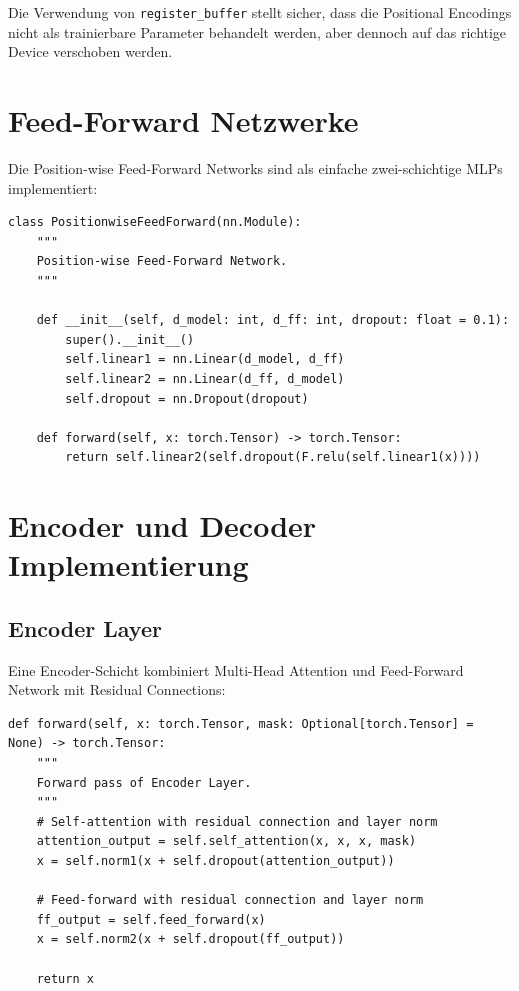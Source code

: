 Die Verwendung von \texttt{register\_buffer} stellt sicher, dass die Positional Encodings nicht als trainierbare Parameter behandelt werden, aber dennoch auf das richtige Device verschoben werden.

\section{Feed-Forward Netzwerke}

Die Position-wise Feed-Forward Networks sind als einfache zwei-schichtige MLPs implementiert:

\begin{lstlisting}[style=pythonstyle, caption=Feed-Forward Network Implementierung]
class PositionwiseFeedForward(nn.Module):
    """
    Position-wise Feed-Forward Network.
    """
    
    def __init__(self, d_model: int, d_ff: int, dropout: float = 0.1):
        super().__init__()
        self.linear1 = nn.Linear(d_model, d_ff)
        self.linear2 = nn.Linear(d_ff, d_model)
        self.dropout = nn.Dropout(dropout)
        
    def forward(self, x: torch.Tensor) -> torch.Tensor:
        return self.linear2(self.dropout(F.relu(self.linear1(x))))
\end{lstlisting}

\section{Encoder und Decoder Implementierung}

\subsection{Encoder Layer}

Eine Encoder-Schicht kombiniert Multi-Head Attention und Feed-Forward Network mit Residual Connections:

\begin{lstlisting}[style=pythonstyle, caption=Encoder Layer Implementierung]
def forward(self, x: torch.Tensor, mask: Optional[torch.Tensor] = None) -> torch.Tensor:
    """
    Forward pass of Encoder Layer.
    """
    # Self-attention with residual connection and layer norm
    attention_output = self.self_attention(x, x, x, mask)
    x = self.norm1(x + self.dropout(attention_output))
    
    # Feed-forward with residual connection and layer norm
    ff_output = self.feed_forward(x)
    x = self.norm2(x + self.dropout(ff_output))
    
    return x
\end{lstlisting}

